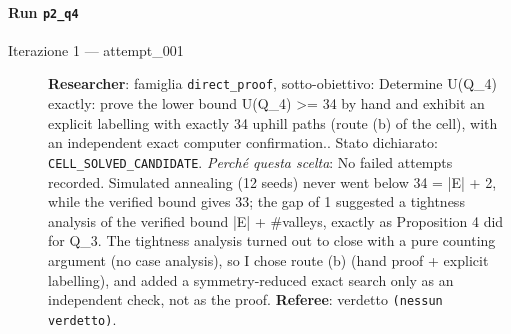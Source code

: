 \documentclass[11pt,a4paper]{article}
\begin{document}
\paragraph{Run \texttt{p2\_q4}}
\begin{description}
\item[Iterazione 1 — attempt\_001]
\textbf{Researcher}: famiglia \texttt{direct\_proof}, sotto-obiettivo: Determine U(Q\_4) exactly: prove the lower bound U(Q\_4) \textgreater{}= 34 by hand and exhibit an explicit labelling with exactly 34 uphill paths (route (b) of the cell), with an independent exact computer confirmation.. Stato dichiarato: \texttt{CELL\_SOLVED\_CANDIDATE}.
\emph{Perché questa scelta}: No failed attempts recorded. Simulated annealing (12 seeds) never went below 34 = |E| + 2, while the verified bound gives 33; the gap of 1 suggested a tightness analysis of the verified bound |E| + \#valleys, exactly as Proposition 4 did for Q\_3. The tightness analysis turned out to close with a pure counting argument (no case analysis), so I chose route (b) (hand proof + explicit labelling), and added a symmetry-reduced exact search only as an independent check, not as the proof.
\textbf{Referee}: verdetto \texttt{(nessun verdetto)}.
\end{description}
\end{document}
